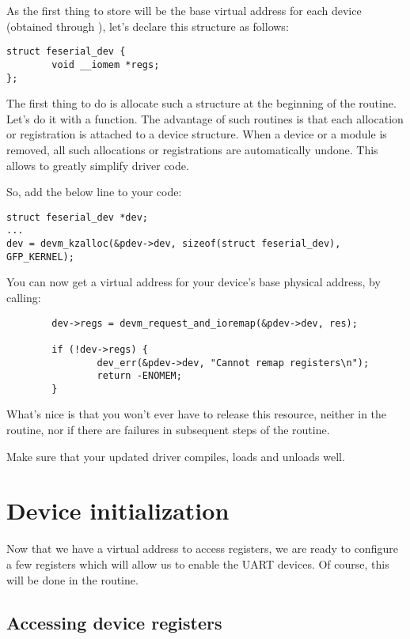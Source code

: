 As the first thing to store will be the base virtual address for
each device (obtained through ), let's declare this
structure as follows:

\begin{verbatim}
struct feserial_dev {
        void __iomem *regs;
};
\end{verbatim}

The first thing to do is allocate such a structure at the beginning
of the  routine. Let's do it with a  function.
The advantage of such routines is that each allocation or registration
is attached to a device structure. When a device or a module is removed,
all such allocations or registrations are automatically undone. This
allows to greatly simplify driver code.

So, add the below line to your code:

\begin{verbatim}
struct feserial_dev *dev;
...
dev = devm_kzalloc(&pdev->dev, sizeof(struct feserial_dev), GFP_KERNEL);
\end{verbatim}

You can now get a virtual address for your device's base physical
address, by calling:

\begin{verbatim}
        dev->regs = devm_request_and_ioremap(&pdev->dev, res);

        if (!dev->regs) {
                dev_err(&pdev->dev, "Cannot remap registers\n");
                return -ENOMEM;
        }
\end{verbatim}

What's nice is that you won't ever have to release this resource,
neither in the  routine, nor if there are failures
in subsequent steps of the  routine.

Make sure that your updated driver compiles, loads and unloads well.

\section{Device initialization}

Now that we have a virtual address to access registers, we are ready to
configure a few registers which will allow us to enable the UART
devices. Of course, this will be done in the  routine.

\subsection{Accessing device registers}

